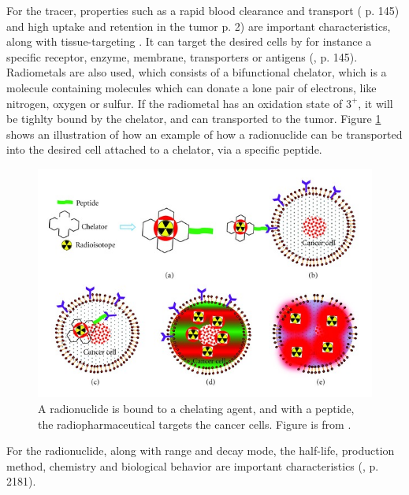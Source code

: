For the tracer, properties such as a rapid blood clearance and transport (\cite{Vallabhajosula2009a} p. 145) and high uptake and retention in the tumor \cite{international2012iaea} p. 2) are important characteristics, along with tissue-targeting \cite{Yeong2014a}. It can target the desired cells by for instance a specific receptor, enzyme, membrane, transporters or antigens (\cite{Vallabhajosula2009a}, p. 145). Radiometals are also used, which consists of a bifunctional chelator, which is a molecule containing molecules which can donate a lone pair of electrons, like nitrogen, oxygen or sulfur. If the radiometal has an oxidation state of $3^+$, it will be tighlty bound by the chelator, and can transported to the tumor\cite{Ekeberg2020}. Figure \ref{fig:therapy_chelator_peptide} shows an illustration of how an example of how a radionuclide can be transported into the desired cell attached to a chelator, via a specific peptide. \\
\begin{figure}
    \centering
    \includegraphics[width=12cm\textwidth]{Theory/therapy-peptide.jpg}
    \caption{A radionuclide is bound to a chelating agent, and with a peptide, the radiopharmaceutical targets the cancer cells. Figure is from \cite{Thundimadathil2012a}. }
    \label{fig:therapy_chelator_peptide}
\end{figure}

For the radionuclide, along with range and decay mode, the half-life, production method, chemistry and biological behavior are important characteristics (\cite{Vertes2011a}, p. 2181). %

